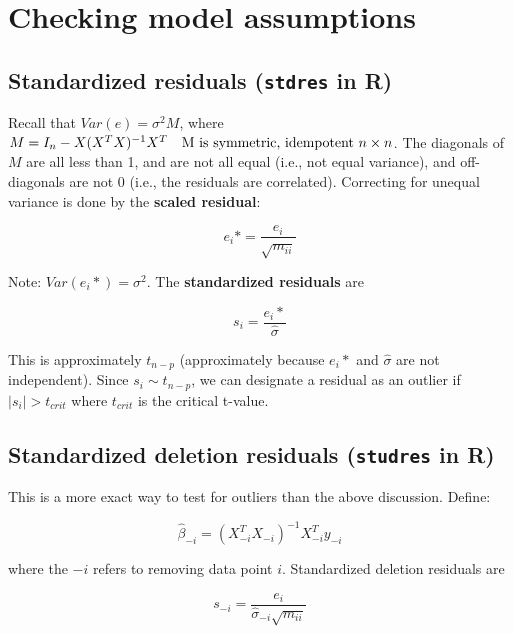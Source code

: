 

\section{Checking model assumptions}

\subsection{Standardized residuals (\texttt{stdres} in R)}

Recall that $Var(e)=\sigma^2 M$, where $M = I_n -  X (X^T X)^{-1} X^T \quad \hbox{M is symmetric, idempotent } n\times n$. The diagonals of $M$ are all less than 1, and are not all equal (i.e., not equal variance), and off-diagonals are not 0 (i.e., the residuals are correlated). Correcting for unequal variance is done by the \textbf{scaled residual}:

\begin{equation}
e_i* = \frac{e_i}{\sqrt{m_{ii}}}
\end{equation}

Note: $Var(e_i*) = \sigma^2$. The \textbf{standardized residuals} are 

\begin{equation}
s_i = \frac{e_i*}{\hat{\sigma}}
\end{equation}

This is approximately $t_{n-p}$ (approximately because $e_i*$ and  $\hat{\sigma}$ are not independent).
Since $s_i\sim t_{n-p}$, we can designate a residual as an outlier if $\mid s_i \mid > t_{crit}$ where $t_{crit}$ is the critical t-value.

\subsection{Standardized deletion residuals (\texttt{studres} in R)}

This is a more exact way to test for outliers than the above discussion. Define:

\begin{equation}
\hat{\beta}_{-i} = (X_{-i}^T X_{-i})^{-1} X_{-i}^T y_{-i}
\end{equation}

\noindent
where the $-i$ refers to removing data point $i$.
Standardized deletion residuals are

\begin{equation}
s_{-i} = \frac{e_i}{\hat{\sigma}_{-i}\sqrt{m_{ii}}}
\end{equation}

